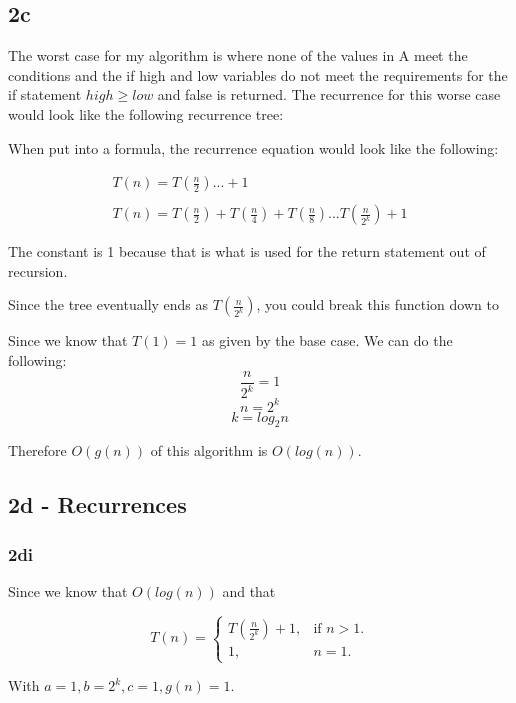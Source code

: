 \documentclass[oneside, a4paper]{article}
\begin{document}
\subsection*{2c}
The worst case for my algorithm is where none of the values in A meet the conditions and the if high and low variables do not meet the requirements for the if statement $high \geq low$ and false is returned. The recurrence for this worse case would look like the following recurrence tree:



When put into a formula, the recurrence equation would look like the following:

\begin{equation}
    \begin{array}{l}
        T(n) = T(\frac{n}{2}) ... + 1\\\\
        T(n) = T(\frac{n}{2}) + T(\frac{n}{4}) + T(\frac{n}{8}) ... T(\frac{n}{2^k}) + 1
      \end{array}
\end{equation}

The constant is 1 because that is what is used for the return statement out of recursion. 

Since the tree eventually ends as $T(\frac{n}{2^k})$, you could break this function down to 

Since we know that $T(1) = 1$ as given by the base case. We can do the following:
$$\frac{n}{2^k} = 1$$
$$n = 2^k$$
$$k = log_2n$$

Therefore $O(g(n))$ of this algorithm is $O(log(n))$.

\subsection*{2d - Recurrences}

\subsubsection*{2di}
Since we know that $O(log(n))$ and that 

\begin{equation}
    T(n)=\begin{cases}
        T(\frac{n}{2^k}) + 1, & \text{if $n>1$}.\\
        1, & \text{$n = 1$}.
    \end{cases}
\end{equation}

With $a = 1, b = 2^k, c = 1, g(n) = 1$. 
\end{document}
